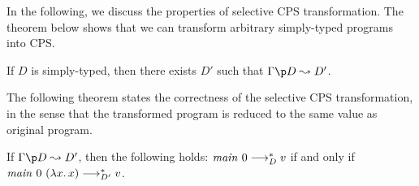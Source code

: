 In the following, we discuss the properties of selective CPS transformation.
The theorem below shows that we can transform arbitrary simply-typed programs into CPS.
\begin{theorem}
If $D$ is simply-typed, then there exists $D'$ such that $\CPSprog{\Gamma}{D}{D'}$.
\end{theorem}
The following theorem states the correctness of the selective CPS
transformation, in the sense that the transformed program is reduced to
the same value as original program.
\begin{theorem}
If $\CPSprog{\Gamma}{D}{D'}$, then the following holds:
${\mathit{main}}~{0} \longrightarrow_{D}^* v$ if and only if ${{\mathit{main}}~{0}}~{(\lambda{x}.\,{x})} \longrightarrow_{D'}^* v$.
\end{theorem}

